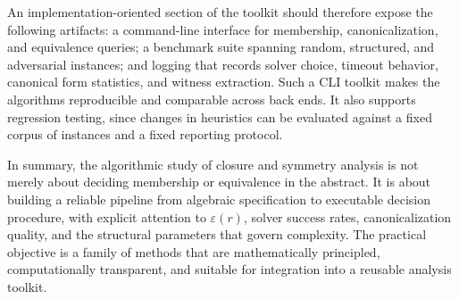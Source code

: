 An implementation-oriented section of the toolkit should therefore expose the following artifacts: a command-line interface for membership, canonicalization, and equivalence queries; a benchmark suite spanning random, structured, and adversarial instances; and logging that records solver choice, timeout behavior, canonical form statistics, and witness extraction. Such a CLI toolkit makes the algorithms reproducible and comparable across back ends. It also supports regression testing, since changes in heuristics can be evaluated against a fixed corpus of instances and a fixed reporting protocol.

In summary, the algorithmic study of closure and symmetry analysis is not merely about deciding membership or equivalence in the abstract. It is about building a reliable pipeline from algebraic specification to executable decision procedure, with explicit attention to \(\varepsilon(r)\), solver success rates, canonicalization quality, and the structural parameters that govern complexity. The practical objective is a family of methods that are mathematically principled, computationally transparent, and suitable for integration into a reusable analysis toolkit.

